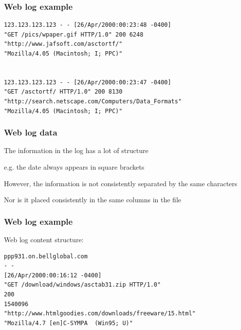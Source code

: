 \documentclass[12pt]{beamer}\usepackage[]{graphicx}\usepackage[]{color}
\begin{document}

\begin{frame}
\begin{center}
\Huge{}
\end{center}
\end{frame}


\begin{frame}[fragile]
\frametitle{Web log example}

\begin{verbatim}
123.123.123.123 - - [26/Apr/2000:00:23:48 -0400] 
"GET /pics/wpaper.gif HTTP/1.0" 200 6248 
"http://www.jafsoft.com/asctortf/" 
"Mozilla/4.05 (Macintosh; I; PPC)"


123.123.123.123 - - [26/Apr/2000:00:23:47 -0400] 
"GET /asctortf/ HTTP/1.0" 200 8130 
"http://search.netscape.com/Computers/Data_Formats" 
"Mozilla/4.05 (Macintosh; I; PPC)"
\end{verbatim}

\end{frame}


\begin{frame}
\frametitle{Web log data}

\bi
  \item The information in the log has a lot of structure
  \item e.g. the date always appears in square brackets
  \item However, the information is not consistently separated by the same characters
  \item Nor is it placed consistently in the same columns in the file
\ei

\end{frame}


\begin{frame}[fragile]
\frametitle{Web log example}

Web log content structure:
\bigskip

{\small
\begin{verbatim}
ppp931.on.bellglobal.com
- -
[26/Apr/2000:00:16:12 -0400]
"GET /download/windows/asctab31.zip HTTP/1.0"
200
1540096
"http://www.htmlgoodies.com/downloads/freeware/15.html"
"Mozilla/4.7 [en]C-SYMPA  (Win95; U)"
\end{verbatim}
}

\end{frame}
\end{document}
